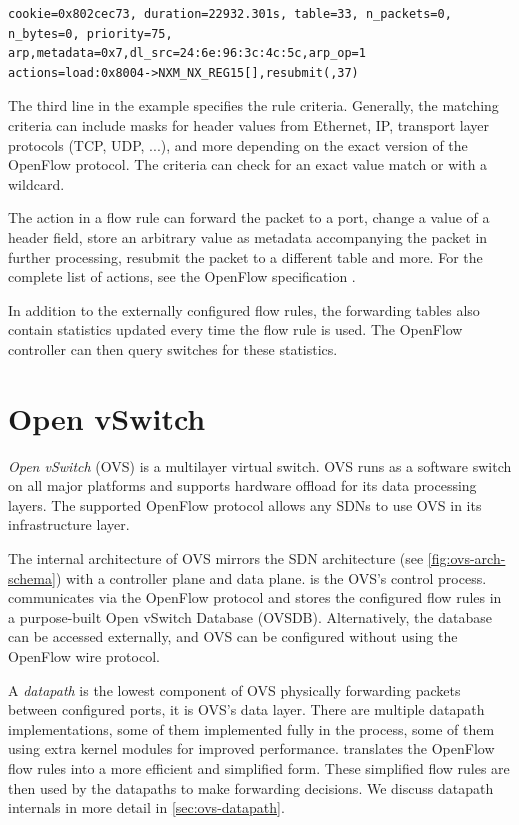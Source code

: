 \begin{verbatim}
cookie=0x802cec73, duration=22932.301s, table=33, n_packets=0,
n_bytes=0, priority=75,
arp,metadata=0x7,dl_src=24:6e:96:3c:4c:5c,arp_op=1
actions=load:0x8004->NXM_NX_REG15[],resubmit(,37)
\end{verbatim}

The third line in the example specifies the rule criteria. Generally, the matching criteria can include masks for header values from Ethernet, IP, transport layer protocols (TCP, UDP, ...), and more depending on the exact version of the OpenFlow protocol. The criteria can check for an exact value match or with a wildcard.

The action in a flow rule can forward the packet to a port, change a value of a header field, store an arbitrary value as metadata accompanying the packet in further processing, resubmit the packet to a different table and more. For the complete list of actions, see the OpenFlow specification .

In addition to the externally configured flow rules, the forwarding tables also contain statistics updated every time the flow rule is used. The OpenFlow controller can then query switches for these statistics.

\section{Open vSwitch}
\label{sec:ovs}

\emph{Open vSwitch} (OVS) is a multilayer virtual switch. OVS runs as a software switch on all major platforms and supports hardware offload for its data processing layers. The supported OpenFlow protocol allows any SDNs to use OVS in its infrastructure layer.

The internal architecture of OVS mirrors the SDN architecture (see \cref{fig:ovs-arch-schema}) with a controller plane and data plane.  is the OVS's control process.  communicates via the OpenFlow protocol and stores the configured flow rules in a purpose-built Open vSwitch Database (OVSDB). Alternatively, the database can be accessed externally, and OVS can be configured without using the OpenFlow wire protocol.

A \emph{datapath} is the lowest component of OVS physically forwarding packets between configured ports, it is OVS's data layer. There are multiple datapath implementations, some of them implemented fully in the  process, some of them using extra kernel modules for improved performance.  translates the OpenFlow flow rules into a more efficient and simplified form. These simplified flow rules are then used by the datapaths to make forwarding decisions. We discuss datapath internals in more detail in \cref{sec:ovs-datapath}.

